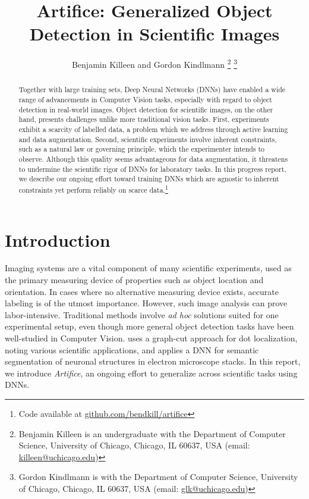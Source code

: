 \documentclass[10pt, journal]{IEEEtran}
\title{Artifice: Generalized Object Detection in Scientific Images}
\author{Benjamin Killeen and Gordon Kindlmann %
  \thanks{Benjamin Killeen is an undergraduate with the Department of Computer
    Science, University of Chicago, Chicago, IL 60637, USA (email:
    \href{mailto:killeen@uchicago.edu}{killeen@uchicago.edu})} %
  \thanks{Gordon Kindlmann is with the Department of Computer Science, 
    University of Chicago, Chicago, IL 60637, USA (email:
    \href{mailto:glk@uchicago.edu}{glk@uchicago.edu})} %
}
\begin{document}
\maketitle

\begin{abstract}
  Together with large training sets, Deep Neural Networks (DNNs) have enabled a
  wide range of advancements in Computer Vision tasks, especially with regard to
  object detection in real-world images. Object detection for scientific images,
  on the other hand, presents challenges unlike more traditional vision
  tasks. First, experiments exhibit a scarcity of labelled data, a problem which
  we address through active learning and data augmentation. Second, scientific
  experiments involve inherent constraints, such as a natural law or governing
  principle, which the experimenter intends to observe. Although this quality
  seems advantageous for data augmentation, it threatens to undermine the
  scientific rigor of DNNs for laboratory tasks. In this progress report, we
  describe our ongoing effort toward training DNNs which are agnostic to
  inherent constraints yet perform reliably on scarce data.\footnote{Code
    available at \href{https://github.com/bendkill/artifice}
    {github.com/bendkill/artifice}}
\end{abstract}

\section{Introduction}
\label{sec:introduction}

Imaging systems are a vital component of many scientific experiments, used as
the primary measuring device of properties such as object location and
orientation. In cases where no alternative measuring device exists, accurate
labeling is of the utmost importance. However, such image analysis can prove
labor-intensive. Traditional methods involve \emph{ad hoc} solutions suited for
one experimental setup, even though more general object detection tasks have
been well-studied in Computer Vision. \cite{bernardis_finding_2010} uses a
graph-cut approach for dot localization, noting various scientific applications,
and \cite{ronneberger_u-net:_2015} applies a DNN for semantic segmentation of
neuronal structures in electron microscope stacks. In this report, we introduce
\emph{Artifice}, an ongoing effort to generalize across scientific tasks using
DNNs.
\end{document}
